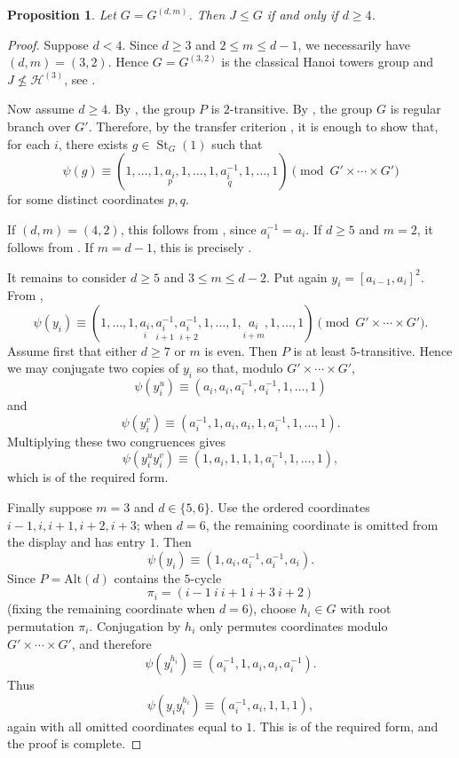 \documentclass[11pt,leqno]{amsart}
\theoremstyle{plain}
\newtheorem{proposition}[proposition]{Proposition}
\DeclareMathOperator{\St}{St}
\newcommand{\alt}{\mathrm{Alt}}
\numberwithin{equation}{section}
\begin{document}
\begin{proposition}\label{IcontainedinG'}
	Let $G=G^{(d,m)}$. Then $J\leq G$ if and only if  $d\geq 4$.
\end{proposition}
\begin{proof}
Suppose $d< 4$. Since $d\geq 3$ and $2\leq m\leq d-1$, we necessarily have  $(d,m)=(3,2)$. Hence $G=G^{(3,2)}$ is the classical Hanoi towers group and  $J\not\leq\mathcal{H}^{(3)}$, see \cite[Remark 3.20]{Rachel}.

Now assume $d\geq 4$. By , the group $P$ is $2$-transitive. By , the group $G$ is regular branch over $G'$. Therefore, by the transfer criterion , it is enough to show that, for each $i$, there exists $g\in\St_G(1)$ such that
	\[
	\psi(g)\equiv
	(1,\ldots,1,\underset{p}{a_i},1,\ldots,1,
	\underset{q}{a_i^{-1}},1,\ldots,1)
	\pmod{G'\times\cdots\times G'}
	\]
	for some distinct coordinates $p,q$.
	
	If $(d,m)=(4,2)$, this follows from , since $a_i^{-1}=a_i$. If $d\geq 5$ and $m=2$, it follows from . If $m=d-1$, this is precisely \cite[Proposition~3.19]{Rachel}.
	
	It remains to consider $d\geq 5$ and $3\leq m\leq d-2$. Put again $y_i=[a_{i-1},a_i]^2$. From ,
	\[
	\psi(y_i)\equiv
	(1,\ldots,1,
	\underset{i}{a_i},
	\underset{i+1}{a_i^{-1}},
	\underset{i+2}{a_i^{-1}},
	1,\ldots,1,
	\underset{i+m}{a_i},
	1,\ldots,1)
	\pmod{G'\times\cdots\times G'}.
	\]
	Assume first that either $d\geq 7$ or $m$ is even. Then $P$ is at least $5$-transitive. Hence we may conjugate two copies of $y_i$ so that, modulo $G'\times\cdots\times G'$,
	\[
	\psi(y_i^u)\equiv(a_i,a_i,a_i^{-1},a_i^{-1},1,\ldots,1)
	\]
	and
	\[
	\psi(y_i^v)\equiv(a_i^{-1},1,a_i,a_i,1,a_i^{-1},1,\ldots,1).
	\]
	Multiplying these two congruences gives
	\[
	\psi(y_i^u y_i^v)\equiv (1,a_i,1,1,1,a_i^{-1},1,\ldots,1),
	\]
	which is of the required form.
	
	Finally suppose $m=3$ and $d\in\{5,6\}$. Use the ordered coordinates $i-1,i,i+1,i+2,i+3$; when $d=6$, the remaining coordinate is omitted from the display and has entry $1$. Then
	\[
	\psi(y_i)\equiv(1,a_i,a_i^{-1},a_i^{-1},a_i).
	\]
	Since $P=\alt(d)$ contains the $5$-cycle
	\[
	\pi_i=(i-1\ i\ i+1\ i+3\ i+2)
	\]
	(fixing the remaining coordinate when $d=6$), choose $h_i\in G$ with root permutation $\pi_i$. Conjugation by $h_i$ only permutes coordinates modulo $G'\times\cdots\times G'$, and therefore
	\[
	\psi(y_i^{h_i})\equiv(a_i^{-1},1,a_i,a_i,a_i^{-1}).
	\]
	Thus
	\[
	\psi(y_i y_i^{h_i})\equiv(a_i^{-1},a_i,1,1,1),
	\]
	again with all omitted coordinates equal to $1$. This is of the required form, and the proof is complete.
\end{proof}
\end{document}
